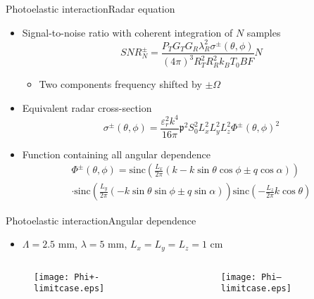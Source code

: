 \documentclass[11pt]{beamer}
\begin{document}
	\begin{frame}{Photoelastic interaction}{Radar equation}
		\pause
		\begin{itemize}
			\item Signal-to-noise ratio with coherent integration of $N$ samples
			\begin{equation*}
				\textit{SNR}^\pm_N = \frac{P_T G_T G_R \lambda_R^2 \sigma^\pm (\theta,\phi)}{(4\pi)^3 R_T^2 R_R^2 k_B T_0 B F} N
			\end{equation*}
			\begin{itemize}
				\item Two components frequency shifted by $\pm \Omega$
			\end{itemize} \pause
			\item Equivalent radar cross-section
			\begin{equation*}
				\sigma^\pm (\theta, \phi) = \frac{\varepsilon_r^2 k^4}{16\pi} \mathfrak{p}^2 S_0^2 L_x^2 L_y^2 L_z^2 \Phi^\pm (\theta,\phi)^2
			\end{equation*} \pause
			\item Function containing all angular dependence
			\begin{multline*}
				\Phi^\pm(\theta,\phi) = \text{sinc} \left( \frac{L_x}{2\pi} \left( k - k\sin{\theta}\cos{\phi} \pm q\cos{\alpha} \right) \right) \\
				\cdot \text{sinc} \left( \frac{L_y}{2\pi} \left( -k\sin{\theta}\sin{\phi} \pm q\sin{\alpha} \right) \right) 
				\text{sinc} \left( -\frac{L_z}{2\pi} k\cos{\theta} \right)
			\end{multline*}
		\end{itemize}
	\end{frame}
	
	\begin{frame}{Photoelastic interaction}{Angular dependence}
		\begin{itemize}
			\item $\Lambda = 2.5$ mm, $\lambda = 5$ mm, $L_x = L_y = L_z = 1$ cm
		\end{itemize}
		\begin{columns}
			\begin{column}{0.5\textwidth}
				\begin{figure}
					\centering
					\texttt{[image: Phi+-limitcase.eps]}
				\end{figure}
			\end{column}
			\begin{column}{0.5\textwidth}
				\begin{figure}
					\centering
					\texttt{[image: Phi--limitcase.eps]}
				\end{figure}
			\end{column}
		\end{columns}
	\end{frame}
	
\end{document}
